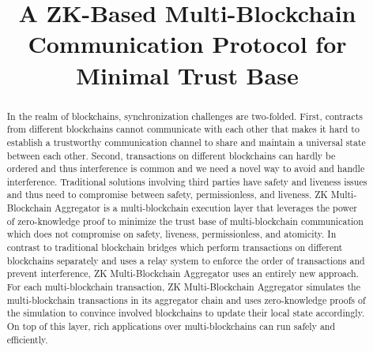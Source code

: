 \documentclass[pageno]{jpaper}
\begin{document}
\title{A ZK-Based Multi-Blockchain Communication Protocol for Minimal Trust Base}
\newcommand{\dprotocol}{ZK Multi-Blockchain Aggregator }
\date{}
\maketitle
\thispagestyle{empty}
\begin{abstract}
In the realm of blockchains, synchronization challenges are two-folded. First, contracts from different blockchains cannot communicate with each other that makes it hard to establish a trustworthy communication channel to share and maintain a universal state between each other. Second, transactions on different blockchains can hardly be ordered and thus interference is common and we need a novel way to avoid and handle interference. Traditional solutions involving third parties have safety and liveness issues and thus need to compromise between safety, permissionless, and liveness.  \dprotocol is a multi-blockchain execution layer that leverages the power of zero-knowledge proof to minimize the trust base of multi-blockchain communication which does not compromise on safety, liveness, permissionless, and atomicity. In contrast to traditional blockchain bridges which perform transactions on different blockchains separately and uses a relay system to enforce the order of transactions and prevent interference, \dprotocol uses an entirely new approach. For each multi-blockchain transaction, \dprotocol simulates the multi-blockchain transactions in its aggregator chain and uses zero-knowledge proofs of the simulation to convince involved blockchains to update their local state accordingly.  On top of this layer, rich applications over multi-blockchains can run safely and efficiently.
\end{abstract}













\end{document}
